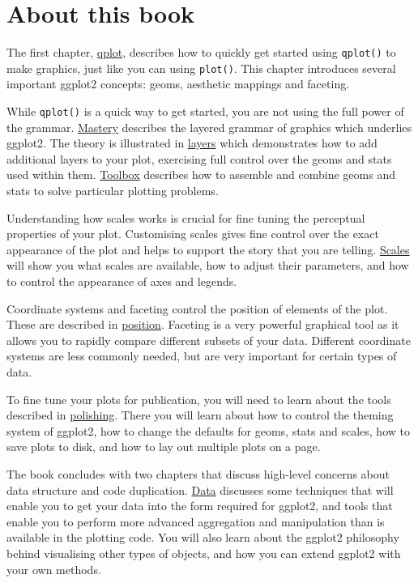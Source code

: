 \section{About this book}

The first chapter, \hyperref[cha:qplot]{qplot}, describes how to quickly
get started using \texttt{qplot()} to make graphics, just like you can
using \texttt{plot()}. This chapter introduces several important ggplot2
concepts: geoms, aesthetic mappings and faceting.

While \texttt{qplot()} is a quick way to get started, you are not using
the full power of the grammar. \hyperref[cha:mastery]{Mastery} describes
the layered grammar of graphics which underlies ggplot2. The theory is
illustrated in \hyperref[cha:layers]{layers} which demonstrates how to
add additional layers to your plot, exercising full control over the
geoms and stats used within them. \hyperref[cha:toolbox]{Toolbox}
describes how to assemble and combine geoms and stats to solve
particular plotting problems.

Understanding how scales works is crucial for fine tuning the perceptual
properties of your plot. Customising scales gives fine control over the
exact appearance of the plot and helps to support the story that you are
telling. \hyperref[cha:scales]{Scales} will show you what scales are
available, how to adjust their parameters, and how to control the
appearance of axes and legends.

Coordinate systems and faceting control the position of elements of the
plot. These are described in \hyperref[cha:position]{position}. Faceting
is a very powerful graphical tool as it allows you to rapidly compare
different subsets of your data. Different coordinate systems are less
commonly needed, but are very important for certain types of data.

To fine tune your plots for publication, you will need to learn about
the tools described in \hyperref[cha:polishing]{polishing}. There you
will learn about how to control the theming system of ggplot2, how to
change the defaults for geoms, stats and scales, how to save plots to
disk, and how to lay out multiple plots on a page.

The book concludes with two chapters that discuss high-level concerns
about data structure and code duplication. \hyperref[cha:data]{Data}
discusses some techniques that will enable you to get your data into the
form required for ggplot2, and tools that enable you to perform more
advanced aggregation and manipulation than is available in the plotting
code. You will also learn about the ggplot2 philosophy behind
visualising other types of objects, and how you can extend ggplot2 with
your own methods.

